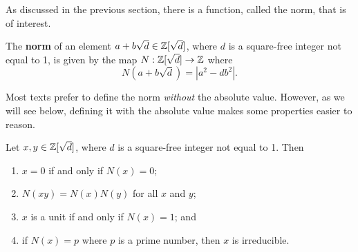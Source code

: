 As discussed in the previous section, there is a function, called the norm, that is of interest.
\begin{definition}
    The \textbf{norm} of an element $a+b\sqrt{d} \in \mathbb{Z}[\sqrt{d}]$, where $d$ is a square-free integer not equal to 1, is given by the map $N: \mathbb{Z}[\sqrt{d}] \to \mathbb{Z}$ where
    \[
        N(a+b\sqrt{d}) = |a^2-db^2|.
    \]
\end{definition}
\begin{remark}
    Most texts prefer to define the norm \textit{without} the absolute value. However, as we will see below, defining it with the absolute value makes some properties easier to reason.
\end{remark}

\begin{proposition}\label{prop-properties-of-quadratic-integer-norm}
    Let $x,y \in \mathbb{Z}[\sqrt{d}]$, where $d$ is a square-free integer not equal to 1. Then
    \begin{enumerate}
        \item $x = 0$ if and only if $N(x) = 0$;
        \item $N(xy) = N(x)N(y)$ for all $x$ and $y$;
        \item $x$ is a unit if and only if $N(x) = 1$; and
        \item if $N(x) = p$ where $p$ is a prime number, then $x$ is irreducible.
    \end{enumerate}
\end{proposition}

